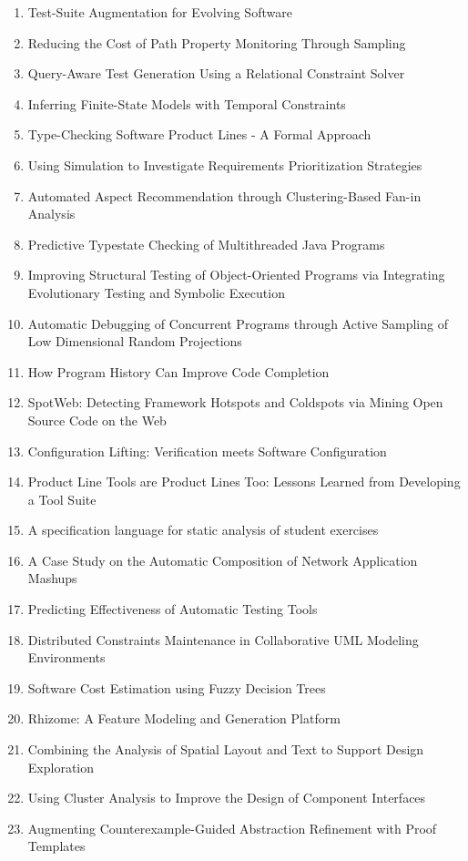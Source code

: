 \begin{enumerate}[itemsep=-1ex]
  \item Test-Suite Augmentation for Evolving Software
  \item Reducing the Cost of Path Property Monitoring Through Sampling
  \item Query-Aware Test Generation Using a Relational Constraint Solver
  \item Inferring Finite-State Models with Temporal Constraints
  \item Type-Checking Software Product Lines - A Formal Approach
  \item Using Simulation to Investigate Requirements Prioritization Strategies
  \item Automated Aspect Recommendation through Clustering-Based Fan-in Analysis
  \item Predictive Typestate Checking of Multithreaded Java Programs
  \item Improving Structural Testing of Object-Oriented Programs via Integrating Evolutionary Testing and Symbolic Execution
  \item Automatic Debugging of Concurrent Programs through Active Sampling of Low Dimensional Random Projections
  \item How Program History Can Improve Code Completion
  \item SpotWeb: Detecting Framework Hotspots and Coldspots via Mining Open Source Code on the Web
  \item Configuration Lifting: Verification meets Software Configuration
  \item Product Line Tools are Product Lines Too: Lessons Learned from Developing a Tool Suite
  \item A specification language for static analysis of student exercises
  \item A Case Study on the Automatic Composition of Network Application Mashups
  \item Predicting Effectiveness of Automatic Testing Tools
  \item Distributed Constraints Maintenance in Collaborative UML Modeling Environments
  \item Software Cost Estimation using Fuzzy Decision Trees
  \item Rhizome: A Feature Modeling and Generation Platform
  \item Combining the Analysis of Spatial Layout and Text to Support Design Exploration
  \item Using Cluster Analysis to Improve the Design of Component Interfaces
  \item Augmenting Counterexample-Guided Abstraction Refinement with Proof Templates

\end{enumerate}
